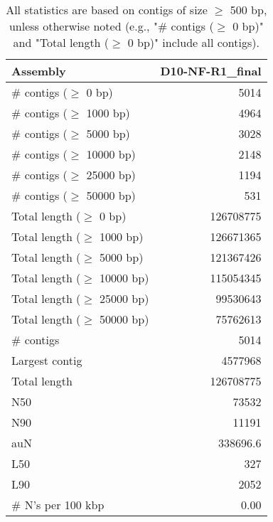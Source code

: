 \documentclass[12pt,a4paper]{article}
\begin{document}
\begin{table}[ht]
\begin{center}
\caption{All statistics are based on contigs of size $\geq$ 500 bp, unless otherwise noted (e.g., "\# contigs ($\geq$ 0 bp)" and "Total length ($\geq$ 0 bp)" include all contigs).}
\begin{tabular}{|l*{1}{|r}|}
\hline
Assembly & D10-NF-R1\_final \\ \hline
\# contigs ($\geq$ 0 bp) & 5014 \\ \hline
\# contigs ($\geq$ 1000 bp) & 4964 \\ \hline
\# contigs ($\geq$ 5000 bp) & 3028 \\ \hline
\# contigs ($\geq$ 10000 bp) & 2148 \\ \hline
\# contigs ($\geq$ 25000 bp) & 1194 \\ \hline
\# contigs ($\geq$ 50000 bp) & 531 \\ \hline
Total length ($\geq$ 0 bp) & 126708775 \\ \hline
Total length ($\geq$ 1000 bp) & 126671365 \\ \hline
Total length ($\geq$ 5000 bp) & 121367426 \\ \hline
Total length ($\geq$ 10000 bp) & 115054345 \\ \hline
Total length ($\geq$ 25000 bp) & 99530643 \\ \hline
Total length ($\geq$ 50000 bp) & 75762613 \\ \hline
\# contigs & 5014 \\ \hline
Largest contig & 4577968 \\ \hline
Total length & 126708775 \\ \hline
N50 & 73532 \\ \hline
N90 & 11191 \\ \hline
auN & 338696.6 \\ \hline
L50 & 327 \\ \hline
L90 & 2052 \\ \hline
\# N's per 100 kbp & 0.00 \\ \hline
\end{tabular}
\end{center}
\end{table}
\end{document}
